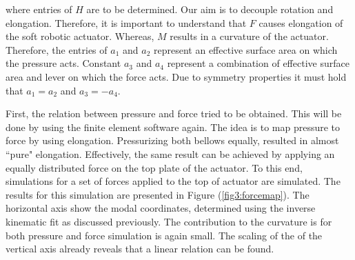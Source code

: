 where entries of $H$ are to be determined. Our aim is to decouple rotation and elongation. Therefore, it is important to understand that $F$ causes elongation of the soft robotic actuator. Whereas, $M$ results in a curvature of the actuator. Therefore, the entries of $a_1$ and $a_2$ represent an effective surface area on which the pressure acts. Constant $a_3$ and $a_4$ represent a combination of effective surface area and lever on which the force acts. Due to symmetry properties it must hold that $a_1 = a_2$ and $a_3 = -a_4$.

First, the relation between pressure and force tried to be obtained. This will be done by using the finite element software again. The idea is to map pressure to force by using elongation. Pressurizing both bellows equally, resulted in almost ``pure" elongation. Effectively, the same result can be achieved by applying an equally distributed force on the top plate of the actuator. To this end, simulations for a set of forces applied to the top of actuator are simulated. The results for this simulation are presented in Figure (\ref{fig3:forcemap}). The horizontal axis show the modal coordinates, determined using the inverse kinematic fit as discussed previously. The contribution to the curvature is for both pressure and force simulation is again small. The scaling of the of the vertical axis already reveals that a linear relation can be found.


